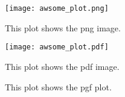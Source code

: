 \documentclass[a4paper, 11pt]{article}
\begin{document}
\renewcommand*\rmdefault{ppl}

\begin{figure}
    \centering
    \texttt{[image: awsome\_plot.png]}

    \caption{This plot shows the png image.}
    \label{fig:png}
\end{figure}

\begin{figure}
    \centering
    \texttt{[image: awsome\_plot.pdf]}

    \caption{This plot shows the pdf image.}
    \label{fig:pdf}
\end{figure}

\begin{figure}
    \hspace{-2.75cm}
    

    \caption{This plot shows the pgf plot.}
    \label{fig:pgf}
\end{figure}
\end{document}
